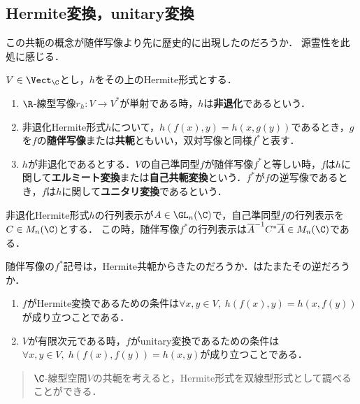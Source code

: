 \documentclass[uplatex, dvipdfmx]{jsreport}
\begin{document}
\subsection{Hermite変換，unitary変換}

\begin{tcolorbox}[colframe=ForestGreen, colback=ForestGreen!10!white, breakable]
    この共軛の概念が随伴写像より先に歴史的に出現したのだろうか．
    源霊性を此処に感じる．
\end{tcolorbox}

\begin{definition}
    $V\in\Vect_\C$とし，$h$をその上のHermite形式とする．
    \begin{enumerate}
        \item $\R$-線型写像$r_h:V\to V^*$が単射である時，$h$は\textbf{非退化}であるという．
        \item 非退化Hermite形式$h$について，$h(f(x),y)=h(x,g(y))$であるとき，$g$を$f$の\textbf{随伴写像}または\textbf{共軛}ともいい，双対写像と同様$f^*$と表す．
        \item $h$が非退化であるとする．$V$の自己準同型$f$が随伴写像$f^*$と等しい時，$f$は$h$に関して\textbf{エルミート変換}または\textbf{自己共軛変換}という．$f^*$が$f$の逆写像であるとき，$f$は$h$に関して\textbf{ユニタリ変換}であるという．
    \end{enumerate}
\end{definition}
\begin{remark}[随伴写像の行列表示]
    非退化Hermite形式$h$の行列表示が$A\in\GL_n(\C)$で，自己準同型$f$の行列表示を$C\in M_n(\C)$とする．
    この時，随伴写像$f^*$の行列表示は$\overline{A}^{-1}C^*\overline{A}\in M_n(\C)$である．

    随伴写像の$f^*$記号は，Hermite共軛からきたのだろうか．はたまたその逆だろうか．
\end{remark}
\begin{remark}\mbox{}
    \begin{enumerate}
        \item $f$がHermite変換であるための条件は$\forall x,y\in V,\; h(f(x),y)=h(x,f(y))$が成り立つことである．
        \item $V$が有限次元である時，$f$がunitary変換であるための条件は$\forall x,y\in V,\;h(f(x),f(y))=h(x,y)$が成り立つことである．
    \end{enumerate}
\end{remark}
\begin{remark}
    \begin{quote}
        $\C$-線型空間$V$の共軛を考えると，Hermite形式を双線型形式として調べることができる．
    \end{quote}
\end{remark}
\end{document}
